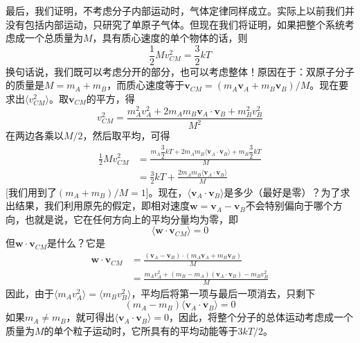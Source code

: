 最后，我们证明，不考虑分子内部运动时，气体定律同样成立。实际上以前我们并没有包括内部运动，只研究了单原子气体。但现在我们将证明，如果把整个系统考虑成一个总质量为$M$，具有质心速度的单个物体的话，则
\begin{equation}
    \label{Eq:I:39:24}
    \frac{1}{2}Mv_{CM}^2 = \frac{3}{2}kT
\end{equation}
换句话说，我们既可以考虑分开的部分，也可以考虑整体！原因在于：双原子分子的质量是$M=m_A+m_B$，而质心速度等于$\boldsymbol{v}_{CM}=(m_A\boldsymbol{v}_A+m_B\boldsymbol{v}_B)/M$。现在要求出$\langle v^2_{CM} \rangle$。取$\boldsymbol{v}_{CM}$的平方，得
\begin{equation*}
    v_{CM}^2 = \frac{m_A^2v_A^2 + 2m_Am_B\boldsymbol{v}_A\cdot\boldsymbol{v}_B + m_B^2v_B^2}{M^2}
\end{equation*}
在两边各乘以$M/2$，然后取平均，可得
\begin{equation*}
    \begin{aligned}
        \frac{1}{2}Mv_{CM}^2 &= \frac{m_A\dfrac{3}{2}kT + 2m_Am_B\langle \boldsymbol{v}_A\cdot\boldsymbol{v}_B \rangle + m_B\dfrac{3}{2}kT}{M} \\
        &= \frac{3}{2}kT + \frac{2m_Am_B\langle \boldsymbol{v}_A\cdot\boldsymbol{v}_B \rangle}{M}
    \end{aligned}
\end{equation*}
[我们用到了$(m_A+m_B)/M=1$]。现在，$\langle \boldsymbol{v}_A\cdot\boldsymbol{v}_B \rangle$是多少（最好是零）？为了求出结果，我们利用原先的假定，即相对速度$\boldsymbol{w}=\boldsymbol{v}_A-\boldsymbol{v}_B$不会特别偏向于哪个方向，也就是说，它在任何方向上的平均分量均为零，即
\begin{equation*}
    \langle \boldsymbol{w}\cdot\boldsymbol{v}_{CM} \rangle = 0
\end{equation*}
但$\boldsymbol{w}\cdot\boldsymbol{v}_{CM}$是什么？它是
\begin{equation*}
    \begin{aligned}
        \boldsymbol{w}\cdot\boldsymbol{v}_{CM} &= \frac{(\boldsymbol{v}_A - \boldsymbol{v}_B) \cdot (m_A\boldsymbol{v}_A + m_B\boldsymbol{v}_B)}{M} \\
        &= \frac{m_Av_A^2 + (m_B-m_A)(\boldsymbol{v}_A\cdot\boldsymbol{v}_B) - m_Bv_B^2}{M}
    \end{aligned}
\end{equation*}
因此，由于$\langle m_Av_A^2 \rangle = \langle m_Bv_B^2 \rangle$，平均后将第一项与最后一项消去，只剩下
\begin{equation*}
    (m_A - m_B) \langle \boldsymbol{v}_A\cdot\boldsymbol{v}_B \rangle = 0
\end{equation*}
如果$m_A \neq m_B$，就可得出$ \langle \boldsymbol{v}_A\cdot\boldsymbol{v}_B \rangle = 0$，因此，将整个分子的总体运动考虑成一个质量为$M$的单个粒子运动时，它所具有的平均动能等于$3kT/2$。

